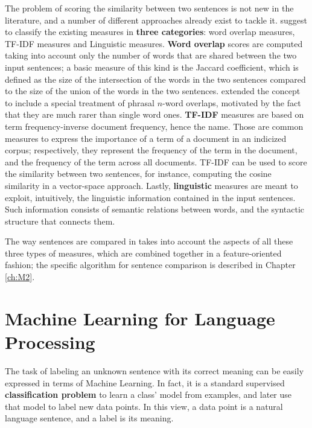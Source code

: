 The problem of scoring the similarity between two sentences is not new in the literature, and a number of different approaches already exist to tackle it. \cite{Achananuparp:2008:ESS:1430555.1430594} suggest to classify the existing measures in \textbf{three categories}: word overlap measures, TF-IDF measures and Linguistic measures. \textbf{Word overlap} scores are computed taking into account only the number of words that are shared between the two input sentences; a basic measure of this kind is the Jaccard coefficient, which is defined as the size of the intersection of the words in the two sentences compared to the size of the union of the words in the two sentences. \cite{Banerjee03extendedgloss} extended the concept to include a special treatment of phrasal $n$-word overlaps, motivated by the fact that they are much rarer than single word ones. \textbf{TF-IDF} measures are based on term frequency-inverse document frequency, hence the name. Those are common measures to express the importance of a term of a document in an  indicized corpus; respectively, they represent the frequency of the term in the document, and the frequency of the term across all documents. TF-IDF can be used to score the similarity between two sentences, for instance, computing the cosine similarity in a vector-space approach. Lastly, \textbf{linguistic} measures are meant to exploit, intuitively, the linguistic information contained in the input sentences. Such information consists of semantic relations between words, and the syntactic structure that connects them. %

The way sentences are compared in \pname takes into account the aspects of all these three types of measures, which are combined together in a feature-oriented fashion; the specific algorithm for sentence comparison is described in Chapter \ref{ch:M2}.


\section{Machine Learning for Language Processing}
The task of labeling an unknown sentence with its correct meaning can be easily expressed in terms of Machine Learning. In fact, it is a standard supervised \textbf{classification problem} to learn a class' model from examples, and later use that model to label new data points. In this view, a data point is a natural language sentence, and a label is its meaning. 

